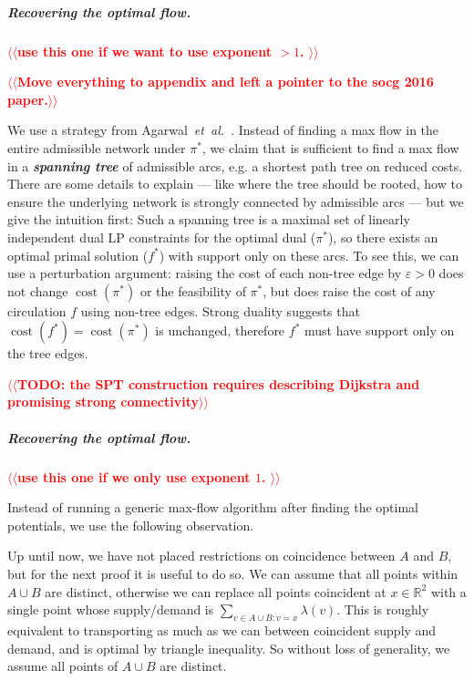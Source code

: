 \documentclass[a4paper,UKenglish]{socg-lipics-v2018}
\makeatletter
\def\note#1{\textcolor{red}{{#1}}}
\def\etal{\emph{et~al.}}
\def\etal{\textit{et~al.}}
\def\eps{\varepsilon}
\def\reals{\mathbb{R}}
\def\tsupply{\lambda}
\def\cost{\operatorname{cost}}
\theoremstyle{plain}
\numberwithin{figure}{section}
\renewcommand{\paragraph}{\subparagraph}
\def\EMPH#1{\textbf{\emph{\boldmath #1}}}
\def\n@te#1{\textsf{\boldmath \textbf{$\langle\!\langle$#1$\rangle\!\rangle$}}\leavevmode}
\def\note#1{\textcolor{red}{\n@te{#1}}}
\makeatother
\begin{document}
\begin{toappendix}

\paragraph{Recovering the optimal flow.}
\note{use this one if we want to use exponent $>1$. } %

\note{Move everything to appendix and left a pointer to the socg 2016 paper.}

We use a strategy from Agarwal~\etal~\cite{AFPVX17}.
Instead of finding a max flow in the entire admissible network under $\pi^*$,
we claim that is sufficient to find a max flow in a \EMPH{spanning tree} of
admissible arcs, e.g. a shortest path tree on reduced costs.
There are some details to explain --- like where the tree should be rooted, how
to ensure the underlying network is strongly connected by admissible arcs ---
but we give the intuition first:
Such a spanning tree is a maximal set of linearly independent dual LP
constraints for the optimal dual ($\pi^*$), so there exists an optimal primal
solution ($f^*$) with support only on these arcs.
To see this, we can use a perturbation argument: raising the cost of each
non-tree edge by $\eps > 0$ does not change $\cost(\pi^*)$ or the feasibility
of $\pi^*$, but does raise the cost of any circulation $f$ using non-tree
edges.
Strong duality suggests that $\cost(f^*) = \cost(\pi^*)$ is unchanged,
therefore $f^*$ must have support only on the tree edges.

\note{TODO: the SPT construction requires describing Dijkstra and promising strong connectivity} %

\paragraph{Recovering the optimal flow.}
\note{use this one if we only use exponent $1$. } %


Instead of running a generic max-flow algorithm after finding the optimal
potentials, we use the following observation.

Up until now, we have not placed restrictions on coincidence between $A$ and $B$, but for the next proof it is useful to do so.
We can assume that all points within $A \cup B$ are distinct, otherwise we can
replace all points coincident at $x \in \reals^2$ with a single point whose
supply/demand is $\sum_{v \in A \cup B: v=x}\tsupply(v)$.
This is roughly equivalent to transporting as much as we can between
coincident supply and demand, and is optimal by triangle inequality.
So without loss of generality, we assume all points of $A \cup B$ are distinct.


\end{toappendix}
\end{document}
